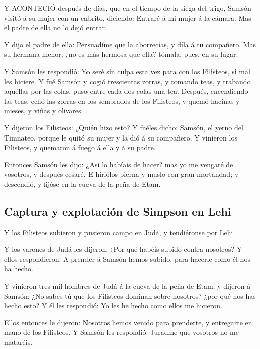  Y ACONTECIÓ después de días, que en el tiempo de la siega
del trigo, Samsón visitó á su mujer con un cabrito, diciendo: Entraré á
mi mujer á la cámara. Mas el padre de ella no lo dejó entrar.

 Y dijo el padre de ella: Persuadíme que la aborrecías, y
díla á tu compañero. Mas su hermana menor, ¿no es más hermosa que ella?
tómala, pues, en su lugar.

 Y Samsón les respondió: Yo seré sin culpa esta vez para con
los Filisteos, si mal les hiciere.  Y fué Samsón y cogió
trescientas zorras, y tomando teas, y trabando aquéllas por las colas,
puso entre cada dos colas una tea.  Después, encendiendo las
teas, echó las zorras en los sembrados de los Filisteos, y quemó hacinas
y mieses, y viñas y olivares.

 Y dijeron los Filisteos: ¿Quién hizo esto? Y fuéles dicho:
Samsón, el yerno del Timnateo, porque le quitó su mujer y la dió á su
compañero. Y vinieron los Filisteos, y quemaron á fuego á ella y á su
padre.

 Entonces Samsón les dijo: ¿Así lo habíais de hacer? mas yo
me vengaré de vosotros, y después cesaré.  E hiriólos pierna
y muslo con gran mortandad; y descendió, y fijóse en la cueva de la peña
de Etam.

\hypertarget{captura-y-explotaciuxf3n-de-simpson-en-lehi}{%
\subsection{Captura y explotación de Simpson en
Lehi}\label{captura-y-explotaciuxf3n-de-simpson-en-lehi}}

 Y los Filisteos subieron y pusieron campo en Judá, y
tendiéronse por Lehi.

 Y los varones de Judá les dijeron: ¿Por qué habéis subido
contra nosotros? Y ellos respondieron: A prender á Samsón hemos subido,
para hacerle como él nos ha hecho.

 Y vinieron tres mil hombres de Judá á la cueva de la peña
de Etam, y dijeron á Samsón: ¿No sabes tú que los Filisteos dominan
sobre nosotros? ¿por qué nos has hecho esto? Y él les respondió: Yo les
he hecho como ellos me hicieron.

 Ellos entonces le dijeron: Nosotros hemos venido para
prenderte, y entregarte en mano de los Filisteos. Y Samsón les
respondió: Juradme que vosotros no me mataréis.

